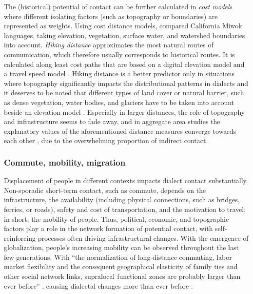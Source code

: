 \documentclass[output=paper]{langscibook}
\begin{document}
The (historical) potential of contact can be further calculated in \textit{cost models} where different isolating factors (such as topography or boundaries) are represented as weights. Using cost distance models, \textcite[][]{Haynie2012} compared California Miwok languages, taking elevation, vegetation, surface water, and watershed boundaries into account. \textit{Hiking distance} approximates the most natural routes of communication, which therefore usually corresponds to historical routes. It is calculated along least cost paths that are based on a digital elevation model and a travel speed model \parencite[e.g.,][]{Tobler1993}. Hiking distance is a better predictor only in situations where topography significantly impacts the distributional patterns in dialects and it deserves to be noted that different types of land cover or natural barrier, such as dense vegetation, water bodies, and glaciers have to be taken into account beside an elevation model \parencite[cf.][]{Derungs2019}.
Especially in larger distances, the role of topography and infrastructure seems to fade away, and in aggregate area studies the explanatory values of the aforementioned distance measures converge towards each other  \parencite[][]{Jeszenszky2019}, due to the overwhelming proportion of indirect contact.

\subsubsection{Commute, mobility, migration}

Displacement of people in different contexts impacts dialect contact substantially.
Non-sporadic short-term contact, such as commute, depends on the infrastructure, the availability (including physical connections, such as bridges, ferries, or roads), safety and cost of transportation, and the motivation to travel; in short, the mobility of people. Thus, political, economic, and topographic factors play a role in the network formation of potential contact, with self-reinforcing processes often driving infrastructural changes. With the emergence of globalization, people's increasing mobility can be observed throughout the last few generations. With “the normalization of long-distance commuting, labor market flexibility and the consequent geographical elasticity of family ties and other social network links, supralocal functional zones are probably larger than ever before” \parencite[][20]{Britain2010LangAndSpace}, causing dialectal changes more than ever before \parencite[cf.][]{Sayers2009thesis}. 
\end{document}
